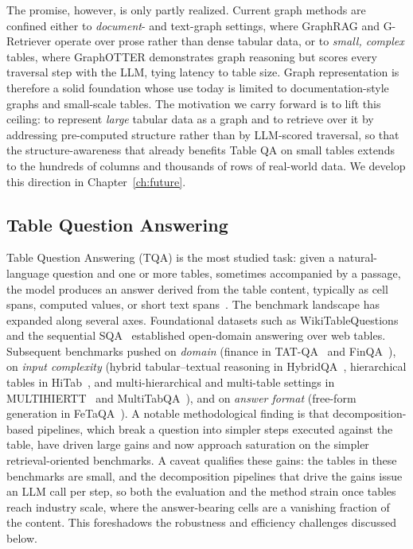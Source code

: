 The promise, however, is only partly realized. Current graph methods are confined either to \emph{document}- and text-graph settings, where GraphRAG and G-Retriever operate over prose rather than dense tabular data, or to \emph{small, complex} tables, where GraphOTTER demonstrates graph reasoning but scores every traversal step with the LLM, tying latency to table size. Graph representation is therefore a solid foundation whose use today is limited to documentation-style graphs and small-scale tables. The motivation we carry forward is to lift this ceiling: to represent \emph{large} tabular data as a graph and to retrieve over it by addressing pre-computed structure rather than by LLM-scored traversal, so that the structure-awareness that already benefits Table QA on small tables extends to the hundreds of columns and thousands of rows of real-world data. We develop this direction in Chapter~\ref{ch:future}.

\subsection{Table Question Answering}
Table Question Answering (TQA) is the most studied task: given a natural-language question and one or more tables, sometimes accompanied by a passage, the model produces an answer derived from the table content, typically as cell spans, computed values, or short text spans~\cite{wu2025tabular}. The benchmark landscape has expanded along several axes. Foundational datasets such as WikiTableQuestions~\cite{pasupat2015wtq} and the sequential SQA~\cite{iyyer2017sqa} established open-domain answering over web tables. Subsequent benchmarks pushed on \emph{domain} (finance in TAT-QA~\cite{zhu2021tatqa} and FinQA~\cite{chen2021finqa}), on \emph{input complexity} (hybrid tabular--textual reasoning in HybridQA~\cite{chen2020hybridqa}, hierarchical tables in HiTab~\cite{cheng2022hitab}, and multi-hierarchical and multi-table settings in MULTIHIERTT~\cite{zhao2022multihiertt} and MultiTabQA~\cite{pal2023multitabqa}), and on \emph{answer format} (free-form generation in FeTaQA~\cite{nan2021fetaqa}). A notable methodological finding is that decomposition-based pipelines, which break a question into simpler steps executed against the table, have driven large gains and now approach saturation on the simpler retrieval-oriented benchmarks. A caveat qualifies these gains: the tables in these benchmarks are small, and the decomposition pipelines that drive the gains issue an LLM call per step, so both the evaluation and the method strain once tables reach industry scale, where the answer-bearing cells are a vanishing fraction of the content. This foreshadows the robustness and efficiency challenges discussed below.

